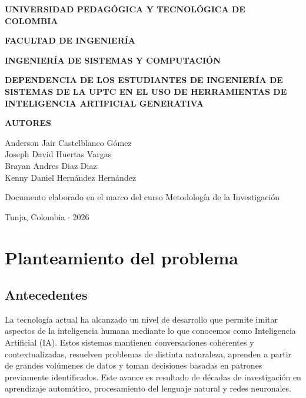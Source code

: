 \documentclass[12pt,a4paper,oneside]{report}
\begin{document}
\begin{titlepage}
  \centering
  {\large\bfseries UNIVERSIDAD PEDAGÓGICA Y TECNOLÓGICA DE COLOMBIA\par}
  \vspace{0.4cm}
  {\large\bfseries FACULTAD DE INGENIERÍA\par}
  \vspace{0.4cm}
  {\large\bfseries INGENIERÍA DE SISTEMAS Y COMPUTACIÓN\par}
  \vspace{2.5cm}
  {\Large\bfseries DEPENDENCIA DE LOS ESTUDIANTES DE INGENIERÍA DE SISTEMAS DE LA UPTC EN EL USO DE HERRAMIENTAS DE INTELIGENCIA ARTIFICIAL GENERATIVA\par}
  \vspace{2.5cm}
  {\large\bfseries AUTORES\par}
  \vspace{0.5cm}
  {\large
  Anderson Jair Castelblanco Gómez\\
  Joseph David Huertas Vargas\\
  Brayan Andres Diaz Diaz\\
  Kenny Daniel Hernández Hernández\par}
  \vfill
  {\normalsize Documento elaborado en el marco del curso Metodología de la Investigación\par}
  \vspace{0.5cm}
  {\normalsize Tunja, Colombia $\cdot$ 2026\par}
\end{titlepage}

\setcounter{page}{2}
\tableofcontents
\clearpage
\listoftables
\clearpage
\listoffigures
\clearpage


\chapter{Planteamiento del problema}

\section{Antecedentes}

La tecnología actual ha alcanzado un nivel de desarrollo que permite imitar aspectos de la inteligencia humana mediante lo que conocemos como Inteligencia Artificial (IA). Estos sistemas mantienen conversaciones coherentes y contextualizadas, resuelven problemas de distinta naturaleza, aprenden a partir de grandes volúmenes de datos y toman decisiones basadas en patrones previamente identificados. Este avance es resultado de décadas de investigación en aprendizaje automático, procesamiento del lenguaje natural y redes neuronales.
\end{document}
